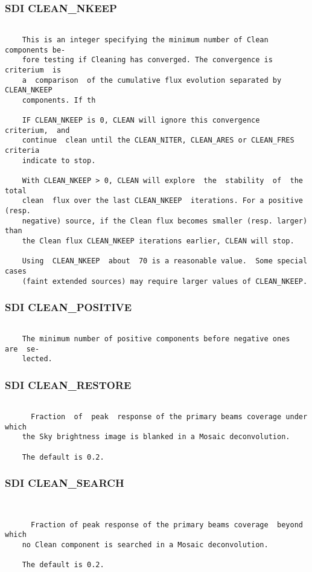 \subsubsection{SDI CLEAN\_NKEEP}
\begin{verbatim}

    This is an integer specifying the minimum number of Clean components be-
    fore testing if Cleaning has converged. The convergence is criterium  is
    a  comparison  of the cumulative flux evolution separated by CLEAN_NKEEP
    components. If th

    IF CLEAN_NKEEP is 0, CLEAN will ignore this convergence  criterium,  and
    continue  clean until the CLEAN_NITER, CLEAN_ARES or CLEAN_FRES criteria
    indicate to stop.

    With CLEAN_NKEEP > 0, CLEAN will explore  the  stability  of  the  total
    clean  flux over the last CLEAN_NKEEP  iterations. For a positive (resp.
    negative) source, if the Clean flux becomes smaller (resp. larger)  than
    the Clean flux CLEAN_NKEEP iterations earlier, CLEAN will stop.

    Using  CLEAN_NKEEP  about  70 is a reasonable value.  Some special cases
    (faint extended sources) may require larger values of CLEAN_NKEEP.

\end{verbatim}
\subsubsection{SDI CLEAN\_POSITIVE}
\begin{verbatim}

    The minimum number of positive components before negative ones  are  se-
    lected.

\end{verbatim}
\subsubsection{SDI CLEAN\_RESTORE}
\begin{verbatim}

      Fraction  of  peak  response of the primary beams coverage under which
    the Sky brightness image is blanked in a Mosaic deconvolution.

    The default is 0.2.

\end{verbatim}
\subsubsection{SDI CLEAN\_SEARCH}
\begin{verbatim}


      Fraction of peak response of the primary beams coverage  beyond  which
    no Clean component is searched in a Mosaic deconvolution.

    The default is 0.2.

\end{verbatim}
